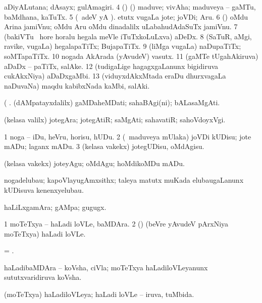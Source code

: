  aDiyALutana; dAsayx; gulAmagiri. 
\eanum
\numie
\num{4} (\rUpa) (\kanmu) maduve; vivAha; maduveya -- gaMTu, baMdhana, kaTuTx. 
\num{5} (\bava\ adeV yA ). etutx \mo vugaLa jote; joVDi; Aru. 
\num{6} (\pArxparx) oMdu Arina jamiVnu; oMdu Aru oMdu dinadalilx uLabahudAdaSuTx jamiVnu. 
\num{7} (bakiVTu \mo\ hore horalu hegala meVle iTuTxkoLuLxva) aDeDx. 
\num{8} (SaTuR, aMgi, ravike, \mo vugaLa) hegalapaTiTx; BujapaTiTx. 
\num{9} (liMga \mo vugaLa) naDupaTiTx; soMTapaTiTx. 
\num{10} nogada AkArada (yAvudeV) vasutx. 
\num{11} (gaMTe tUgahAkiruva) aDaDx -- paTiTx, salAke. 
\num{12} (tudigaLige hagagxgaLanunx bigidiruva cukAkxNiya) aDaDxgaMbi. 
\num{13} (viduyxdAkxMtada eraDu dhurxvagaLa naDuvaNa) maqdu kabibxNada kaMbi, salAki.
\enum
\emng

\noindent                               
\gl{\pagu} 
\bmng
{} (  . 
\banum
{} (dAMpatayxdalilx) gaMDaheMDati; sahaBAgi(ni); bALasaMgAti.  

  (kelasa \mo valilx) jotegAra; jotegAtiR; saMgAti; sahavatiR; sahoVdoyxVgi.
\eanum
\emng
\eentry

\bentry
{} 
\gl{\sakirx} 
\bmng
\bnum
\num{1} noga -- iDu, heVru, horisu, hUDu. 
\num{2} (\kanmu\ maduveya mUlaka) joVDi kUDisu; jote mADu; laganx mADu. 
\num{3} (kelasa \mo vakekx) jotegUDisu, oMdAgisu.
\enum
\emng

\noindent
\gl{\akirx} 
\bmng
(kelasa \mo vakekx) joteyAgu; oMdAgu; hoMdikoMDu mADu.
\emng
\eentry

\bentry
{} 
\gl{\nA} 
\bmng
nogadelubau; kapoVlayugAmxsithx; taleya matutx muKada elubaugaLanunx kUDisuva kenenxyelubau.
\emng
\eentry

\bentry
{} 
\gl{\nA} 
\bmng
haLiLxgamAra; gAMpa; gugugx.
\emng
\eentry

\bentry
{}  
\gl{\nA} 
\bmng
\bnum
\num{1} moTeTxya -- haLadi loVLe, baMDAra.
\num{2} (\jiVvi) (beVre yAvudeV pArxNiya moTeTxya) haLadi loVLe.
\enum
\emng 
\eentry

\bentry
{}  
\gl{\nA}
\bmng
= .
\emng 
\eentry

\bentry
{} 
\gl{\nA} 
\bmng
haLadibaMDAra -- koVsha, ciVla; moTeTxya haLadiloVLeyanunx sututxvaridiruva koVsha.
\emng
\eentry

\bentry
{} 
\gl{\gu} 
\bmng
(moTeTxya) haLadiloVLeya; haLadi loVLe -- iruva, tuMbida.
\emng
\eentry

